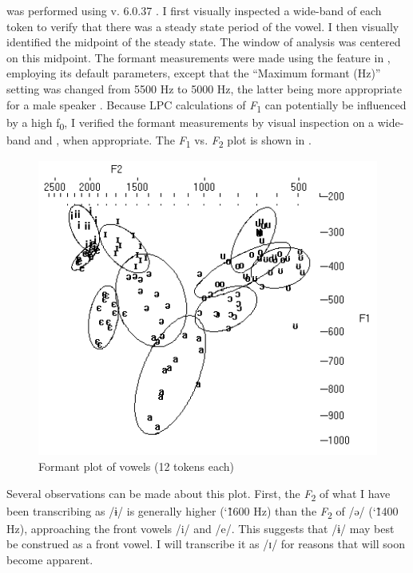\documentclass[output=paper,colorlinks,citecolor=brown]{langscibook}
\begin{document}
 was performed using  v. 6.0.37 \citep{BoersmaWeenink2018}. I first visually inspected a wide-band  of each token to verify that there was a steady state period of the vowel. I then visually identified the midpoint of the steady state. The window of analysis was centered on this midpoint. The formant measurements were made using the  feature in , employing its default parameters, except that the “Maximum formant (Hz)” setting was changed from 5500 Hz to 5000 Hz, the latter being more appropriate for a male speaker \citep{BoersmaWeenink2018}. Because LPC calculations of \textit{F}\textsubscript{1} can potentially be influenced by a high ƒ\textsubscript{0}, I verified the formant measurements by visual inspection on a wide-band  and , when appropriate. The \textit{F}\textsubscript{1} vs. \textit{F}\textsubscript{2} plot is shown in .

\begin{figure}
    \includegraphics[height=.3\textheight]{figures/OlsonFig1.png}
    \caption{Formant plot of  vowels (12 tokens each)}
    \label{fig:olson:1}
\end{figure}

Several observations can be made about this plot. First, the \textit{F}\textsubscript{2} of what I have been transcribing as /ɨ/ is generally higher (\char`\~1600 Hz) than the \textit{F}\textsubscript{2} of /ə/ (\char`\~1400 Hz), approaching the front vowels /i/ and /e/. This suggests that /ɨ/ may best be construed as a front vowel. I will transcribe it as /ɪ/ for reasons that will soon become apparent.
\end{document}

